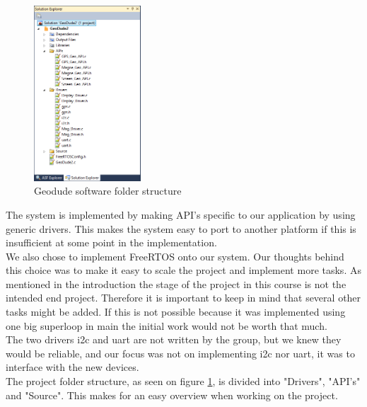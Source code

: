 \begin{figure}
\vspace{-30pt}
\begin{center}
\includegraphics[width=4cm]{billeder/folder_structure}
\end{center}
\vspace{-20pt}
\caption{Geodude software folder structure}
\vspace{-20pt}
\label{fig:fold_structure}
\end{figure}
The system is implemented by making API's specific to our application by using generic drivers. This makes the system easy to port to another platform if this is insufficient at some point in the implementation.\\
We also chose to implement FreeRTOS onto our system. Our thoughts behind this choice was to make it easy to scale the project and implement more tasks. As mentioned in the introduction the stage of the project in this course is not the intended end project. Therefore it is important to keep in mind that several other tasks might be added. If this is not possible because it was implemented using one big superloop in main the initial work would not be worth that much.\\
The two drivers i2c and uart are not written by the group, but we knew they would be reliable, and our focus was not on implementing i2c nor uart, it was to interface with the new devices.\\
The project folder structure, as seen on figure \ref{fig:fold_structure}, is divided into "Drivers", "API's" and "Source". This makes for an easy overview when working on the project.\\

